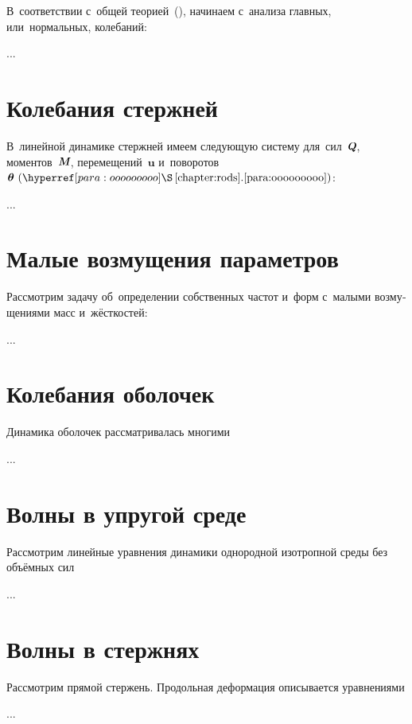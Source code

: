 \begin{otherlanguage}{russian}
\vspace{.2em} В~соответствии с~общей теорией~(), начинаем с~анализа главных, или~нормальных, колебаний:

...




\section{Колебания стержней}

В~линейной динамике стержней имеем следующую систему для~сил~$\mathboldQ$, моментов~$\mathboldM$, перемещений~$\bm{u}$ и~поворотов~$\bm{\theta}~(\chapdotpararef{chapter:rods}{para:ooooooooo})$:

...




\section{Малые возмущения параметров}

Рассмотрим задачу об~определении собственных частот и~форм с~малыми возмущениями масс и~жёсткостей:

...




\section{Колебания оболочек}

Динамика оболочек рассматривалась многими

...




\section{Волны в упругой среде}

Рассмотрим линейные уравнения динамики однородной изотропной среды без объёмных сил

...




\section{Волны в стержнях}

Рассмотрим прямой стержень. Продольная деформация описывается уравнениями

...





\end{otherlanguage}
